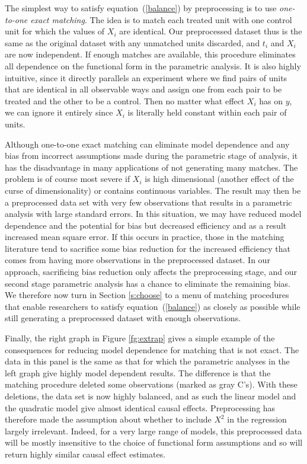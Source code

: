 \documentclass[11pt,titlepage]{article}
\begin{document}
The simplest way to satisfy equation~(\ref{balance}) by preprocessing
is to use \emph{one-to-one exact matching}.  The idea is to match each
treated unit with one control unit for which the values of $X_i$ are
identical.  Our preprocessed dataset thus is the same as the original
dataset with any unmatched units discarded, and $t_i$ and $X_i$ are
now independent.  If enough matches are available, this procedure
eliminates all dependence on the functional form in the parametric
analysis.  It is also highly intuitive, since it directly parallels an
experiment where we find pairs of units that are identical in all
observable ways and assign one from each pair to be treated and the
other to be a control.  Then no matter what effect $X_i$ has on $y$,
we can ignore it entirely since $X_i$ is literally held constant
within each pair of units.

Although one-to-one exact matching can eliminate model dependence and
any bias from incorrect assumptions made during the parametric stage
of analysis, it has the disadvantage in many applications of not
generating many matches.  The problem is of course most severe if
$X_i$ is high dimensional (another effect of the curse of
dimensionality) or contains continuous variables.  The result may then
be a preprocessed data set with very few observations that results in
a parametric analysis with large standard errors.  In this situation,
we may have reduced model dependence and the potential for bias but
decreased efficiency and as a result increased mean square error.  If
this occurs in practice, those in the matching literature tend to
sacrifice some bias reduction for the increased efficiency that comes
from having more observations in the preprocessed dataset.  In our
approach, sacrificing bias reduction only affects the preprocessing
stage, and our second stage parametric analysis has a chance to
eliminate the remaining bias.  We therefore now turn in Section
\ref{s:choose} to a menu of matching procedures that enable
researchers to satisfy equation~(\ref{balance}) as closely as possible
while still generating a preprocessed dataset with enough
observations.

Finally, the right graph in Figure \ref{fg:extrap} gives a simple
example of the consequences for reducing model dependence for matching
that is not exact.  The data in this panel is the same as that for
which the parametric analyses in the left graph give highly model
dependent results.  The difference is that the matching procedure
deleted some observations (marked as gray C's).  With these deletions,
the data set is now highly balanced, and as such the linear model and
the quadratic model give almost identical causal effects.
Preprocessing has therefore made the assumption about whether to
include $X^2$ in the regression largely irrelevant.  Indeed, for a
very large range of models, this preprocessed data will be mostly
insensitive to the choice of functional form assumptions and so will
return highly similar causal effect estimates.
\end{document}
